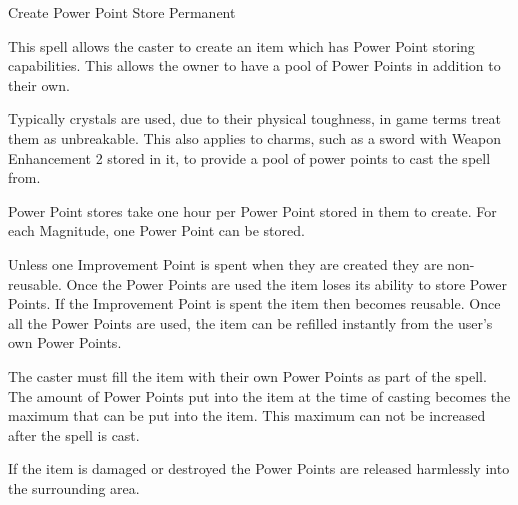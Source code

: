 \begin{rpg-spell}
{Create Power Point Store}
{Permanent}

This spell allows the caster to create an item which has Power Point storing capabilities. This allows the owner to have a pool of Power Points in addition to their own.

Typically crystals are used, due to their physical toughness, in game terms treat them as unbreakable. This also applies to charms, such as a sword with Weapon Enhancement 2 stored in it, to provide a pool of power points to cast the spell from.

Power Point stores take one hour per Power Point stored in them to create. For each Magnitude, one Power Point can be stored.

Unless one Improvement Point is spent when they are created they are non-reusable. Once the Power Points are used the item loses its ability to store Power Points. If the Improvement Point is spent the item then becomes reusable. Once all the Power Points are used, the item can be refilled instantly from the user’s own Power Points.

The caster must fill the item with their own Power Points as part of the spell. The amount of Power Points put into the item at the time of casting becomes the maximum that can be put into the item. This maximum can not be increased after the spell is cast.

If the item is damaged or destroyed the Power Points are released harmlessly into the surrounding area.
\end{rpg-spell}


